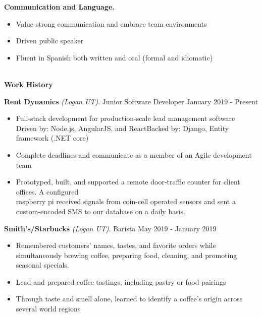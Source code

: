 \documentclass[letterpaper,11pt]{article}
\begin{document}
\noindent\textbf{Communication and Language.}
\begin{itemize}[noitemsep,topsep=0pt]
	\item Value strong communication and embrace team environments
	\item Driven public speaker
	\item Fluent in Spanish both written and oral (formal and idiomatic)
\end{itemize}


\begin{Large}\textbf{\\Work History}\end{Large}

\textbf{Rent Dynamics} \textit{(Logan UT)}. Junior Software Developer \hfill January 2019 - Present
\begin{itemize}[noitemsep,topsep=0pt]
	\item Full-stack development for production-scale lead management software\\ Driven by: Node.js, AngularJS, and React\qquad\quad Backed by: Django, Entity framework (.NET core)
	\item Complete deadlines and communicate as a member of an Agile development team
	\item Prototyped, built, and supported a remote door-traffic counter for client offices. A configured\\raspberry pi received signals from coin-cell operated sensors and sent a custom-encoded SMS to our database on a daily basis.\\
\end{itemize}

\textbf{Smith's/Starbucks} \textit{(Logan UT)}. Barista \hfill May 2019 - January 2019
\begin{itemize}[noitemsep,topsep=0pt]
	\item Remembered customers' names, tastes, and favorite orders while simultaneously brewing coffee, preparing food, cleaning, and promoting seasonal specials.
	\item Lead and prepared coffee tastings, including pastry or food pairings
	\item Through taste and smell alone, learned to identify a coffee's origin across several world regions\\

\end{itemize}
\end{document}
